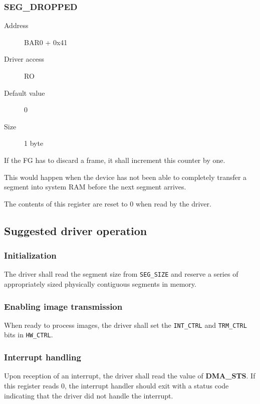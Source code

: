 \documentclass[12pt]{article}
\begin{document}
\subsubsection{SEG\_DROPPED}

\begin{description}
\item[Address] BAR0 + 0x41
\item[Driver access] RO
\item[Default value] 0
\item[Size] 1 byte
\end{description}

If the FG has to discard a frame, it shall increment this counter by one.

This would happen when the device has not been able to completely transfer a segment into system RAM before the next segment arrives.

The contents of this register are reset to 0 when read by the driver.

\subsection{Suggested driver operation}

\subsubsection{Initialization}

The driver shall read the segment size from \texttt{SEG\_SIZE} and reserve a series of appropriately sized physically contiguous segments in memory.

\subsubsection{Enabling image transmission}

When ready to process images, the driver shall set the \texttt{INT\_CTRL} and \texttt{TRM\_CTRL} bits in \texttt{HW\_CTRL}.

\subsubsection{Interrupt handling}

Upon reception of an interrupt, the driver shall read the value of \textbf{DMA\_STS}. If this register reads 0, the interrupt handler should exit with a status code indicating that the driver did not handle the interrupt.
\end{document}
